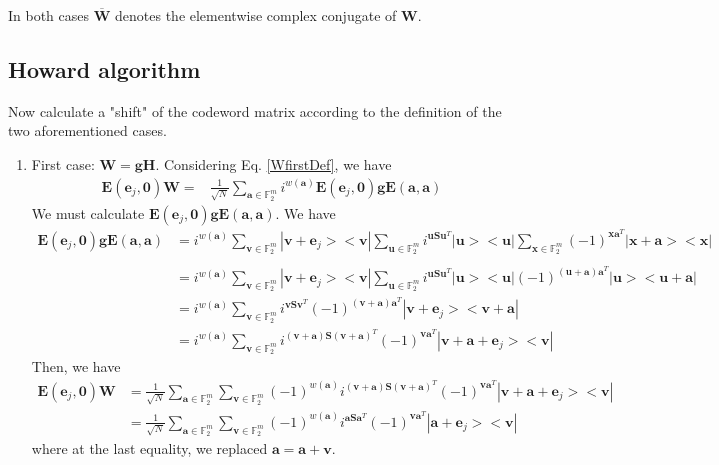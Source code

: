 \documentclass{article}
\begin{document}
In both cases $\overline{\mathbf{W}}$ denotes the elementwise complex conjugate of $\mathbf{W}$.

\subsection*{Howard algorithm}
Now calculate a "shift" of the codeword matrix according to the definition of the two aforementioned cases.
\begin{enumerate}
	\item First case: $\mathbf{W=gH}$. Considering Eq. \ref{WfirstDef}, we have
	\begin{align*}
		\mathbf{E}(\mathbf{e}_j, \mathbf{0})\mathbf{W} = &\frac{1}{\sqrt{N}} \sum_{\mathbf{a} \in \mathbb{F}^m_2} i^{w(\mathbf{a})}\mathbf{E}(\mathbf{e}_j,\mathbf{0})\mathbf{g}\mathbf{E}(\mathbf{a},\mathbf{a}) 
	\end{align*}
	We must calculate $\mathbf{E}(\mathbf{e}_j,\mathbf{0})\mathbf{g}\mathbf{E}(\mathbf{a},\mathbf{a})$. We have
	\begin{align*}
		\mathbf{E}(\mathbf{e}_j,\mathbf{0})\mathbf{g}\mathbf{E}(\mathbf{a},\mathbf{a})& = 	i^{w(\mathbf{a})}  \sum_{\mathbf{v} \in \mathbb{F}_2^m}{ |\mathbf{v}+\mathbf{e}_j><\mathbf{v}|}  \sum_{\mathbf{u} \in \mathbb{F}_2^m}{i^{\mathbf{u S}\mathbf{u}^T} |\mathbf{u}><\mathbf{u}|}\sum_{\mathbf{x} \in \mathbb{F}_2^m}{ (-1)^{\mathbf{x}\mathbf{a}^T}|\mathbf{x+a}><\mathbf{x}|} \\
		\\
		&= i^{w(\mathbf{a})}  \sum_{\mathbf{v} \in \mathbb{F}_2^m}{ |\mathbf{v}+\mathbf{e}_j><\mathbf{v}|}  \sum_{\mathbf{u} \in \mathbb{F}_2^m}{i^{\mathbf{u S}\mathbf{u}^T} |\mathbf{u}><\mathbf{u}|} (-1)^{(\mathbf{u+a})\mathbf{a}^T}|\mathbf{u}><\mathbf{u+a}| \\
		&= i^{w(\mathbf{a})} \sum_{\mathbf{v} \in \mathbb{F}_2^m}{i^{\mathbf{v}\mathbf{S}\mathbf{v}^T}(-1)^{(\mathbf{v+a})\mathbf{a}^T} |\mathbf{v}+\mathbf{e}_j><\mathbf{v+a}|} \\
		& = i^{w(\mathbf{a})} \sum_{\mathbf{v} \in \mathbb{F}_2^m}{i^{(\mathbf{v+a})\mathbf{S}(\mathbf{v+a})^T}(-1)^{\mathbf{v}\mathbf{a}^T} |\mathbf{v+a}+\mathbf{e}_j><\mathbf{v}|}
	\end{align*}
	Then, we have
	\begin{align*}
		\mathbf{E}(\mathbf{e}_j, \mathbf{0})\mathbf{W} &= \frac{1}{\sqrt{N}}  \sum_{\mathbf{a} \in \mathbb{F}_2^m}{\sum_{\mathbf{v} \in \mathbb{F}_2^m}{ (-1)^{w(\mathbf{a})} i^{(\mathbf{v+a})\mathbf{S}(\mathbf{v+a})^T}(-1)^{\mathbf{v}\mathbf{a}^T} |\mathbf{v+a}+\mathbf{e}_j><\mathbf{v}|}}\\
		& = \frac{1}{\sqrt{N}}  \sum_{\mathbf{a} \in \mathbb{F}_2^m}{\sum_{\mathbf{v} \in \mathbb{F}_2^m}{ (-1)^{w(\mathbf{a})} i^{\mathbf{a}\mathbf{S}\mathbf{a}^T}(-1)^{\mathbf{v}\mathbf{a}^T} |\mathbf{a}+\mathbf{e}_j><\mathbf{v}|}}
	\end{align*}
	where at the last equality, we replaced $\mathbf{a=a+v}$. 
	

\end{enumerate}
\end{document}
